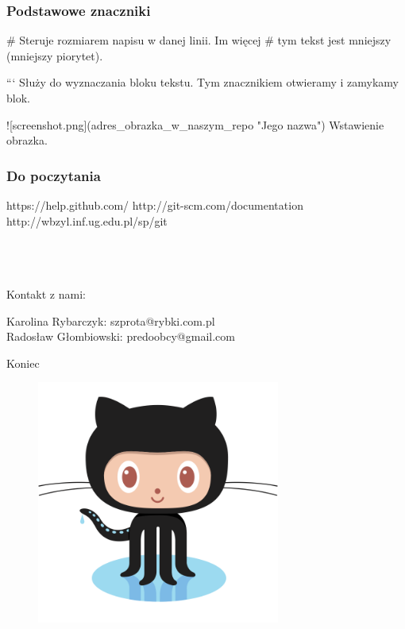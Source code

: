 \documentclass[9pt]{beamer}
\begin{document}
		
	\begin{frame}
		\frametitle{Podstawowe znaczniki}

			\begin{block}{\#}
				Steruje rozmiarem napisu w danej linii. Im więcej \# tym tekst jest mniejszy (mniejszy piorytet).
			\end{block}	

			\begin{block}{```}
				Służy do wyznaczania bloku tekstu. Tym znacznikiem otwieramy i zamykamy blok.
			\end{block}	
			
			\begin{block}{![screenshot.png](adres\_obrazka\_w\_naszym\_repo "Jego nazwa")}
				Wstawienie obrazka.
			\end{block}	
						
	\end{frame}
	
	
	\begin{frame}
	\frametitle{Do poczytania}
	\footnotesize{
	\begin{thebibliography}{99} %
	 https://help.github.com/
	 http://git-scm.com/documentation
	 http://wbzyl.inf.ug.edu.pl/sp/git

	\end{thebibliography}
	}
	
	\begin{block}{\\~\\~\\Kontakt z nami:}
	
	Karolina Rybarczyk: szprota@rybki.com.pl \\
	Radosław Głombiowski: predoobcy@gmail.com

    \end{block}
	
	
	\end{frame}


	\begin{frame}
	\Huge{\centerline{Koniec}}
			
		\begin{figure}
			\centering
			\includegraphics[height=8cm]{Octocat.png}
		\end{figure}
	
	\end{frame}

\end{document}

